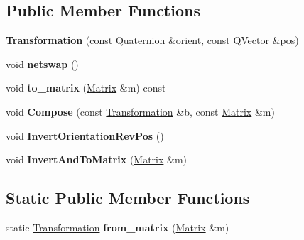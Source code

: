 \subsection*{Public Member Functions}
\begin{DoxyCompactItemize}
\item 
{\bfseries Transformation} (const \hyperlink{structQuaternion}{Quaternion} \&orient, const Q\+Vector \&pos)\hypertarget{structTransformation_af09e26dd207d0ecabc1a4e985e4b168e}{}\label{structTransformation_af09e26dd207d0ecabc1a4e985e4b168e}

\item 
void {\bfseries netswap} ()\hypertarget{structTransformation_afce59ba2666b5b99b69ede1c783ac940}{}\label{structTransformation_afce59ba2666b5b99b69ede1c783ac940}

\item 
void {\bfseries to\+\_\+matrix} (\hyperlink{classMatrix}{Matrix} \&m) const \hypertarget{structTransformation_aaee6d26383536738dd549027cdfc111f}{}\label{structTransformation_aaee6d26383536738dd549027cdfc111f}

\item 
void {\bfseries Compose} (const \hyperlink{structTransformation}{Transformation} \&b, const \hyperlink{classMatrix}{Matrix} \&m)\hypertarget{structTransformation_a1f2a0ac9c92cbfb287e661ce28b6985f}{}\label{structTransformation_a1f2a0ac9c92cbfb287e661ce28b6985f}

\item 
void {\bfseries Invert\+Orientation\+Rev\+Pos} ()\hypertarget{structTransformation_a7a81591e083c06169f38ec3f44923cff}{}\label{structTransformation_a7a81591e083c06169f38ec3f44923cff}

\item 
void {\bfseries Invert\+And\+To\+Matrix} (\hyperlink{classMatrix}{Matrix} \&m)\hypertarget{structTransformation_a12c9c65437f356630c35a614f26ebf74}{}\label{structTransformation_a12c9c65437f356630c35a614f26ebf74}

\end{DoxyCompactItemize}
\subsection*{Static Public Member Functions}
\begin{DoxyCompactItemize}
\item 
static \hyperlink{structTransformation}{Transformation} {\bfseries from\+\_\+matrix} (\hyperlink{classMatrix}{Matrix} \&m)\hypertarget{structTransformation_a8b9e7ee9a09cdcf324f9aac4dae4170e}{}\label{structTransformation_a8b9e7ee9a09cdcf324f9aac4dae4170e}

\end{DoxyCompactItemize}
